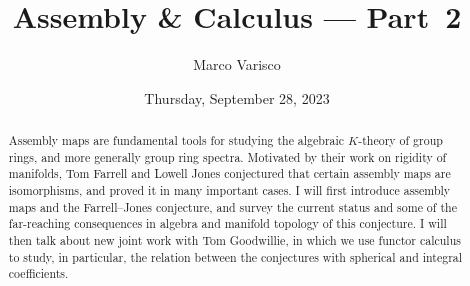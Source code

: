 \documentclass{UAmathtalk}
\author{Marco Varisco}
\title{Assembly \& Calculus --- Part~2}
\date{Thursday, September 28, 2023}
\begin{document}
\maketitle

\begin{abstract}
Assembly maps are fundamental tools for studying the algebraic $K$-theory of group rings, and more generally group ring spectra. Motivated by their work on rigidity of manifolds, Tom Farrell and Lowell Jones conjectured that certain assembly maps are isomorphisms, and proved it in many important cases. I will first introduce assembly maps and the Farrell–Jones conjecture, and survey the current status and some of the far-reaching consequences in algebra and manifold topology of this conjecture. I will then talk about new joint work with Tom Goodwillie, in which we use functor calculus to study, in particular, the relation between the conjectures with spherical and integral coefficients.
\end{abstract}
\end{document}
